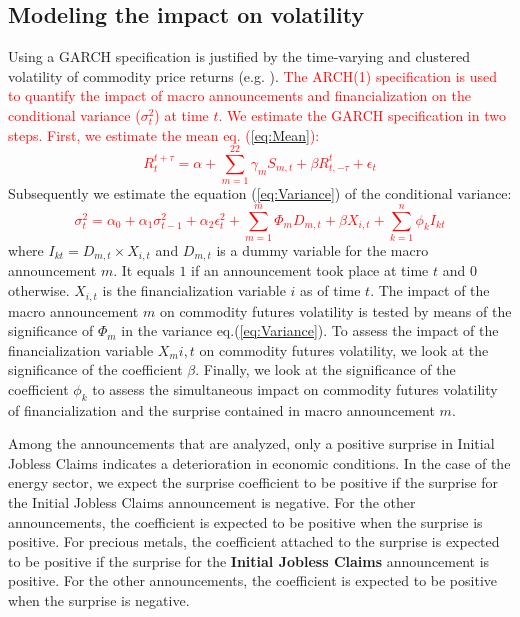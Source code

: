 \documentclass[12pt]{article}
\begin{document}
\subsection{Modeling the impact on volatility}\label{variance}
Using a GARCH specification is justified by the time-varying and clustered volatility of commodity price returns (e.g. \citep{hammoudeh2008metal}).
\textcolor{red}{
The ARCH(1) specification is used to quantify the impact of macro announcements and financialization on the conditional variance  ($\sigma_t^2$) at time $t$. We estimate the GARCH specification in two steps. First, we estimate the mean eq. (\ref{eq:Mean}):
\begin{equation}\label{eq:Mean}R_{t}^{t+\tau}=\alpha+\sum_{m=1}^{22} \gamma_m S_{m,t}+\beta R_{t,-\tau}^{t}+\epsilon_{t}
\end{equation}
}
Subsequently we estimate the equation (\ref{eq:Variance}) of the conditional variance:
\textcolor{red}{
\begin{equation}\label{eq:Variance}
\sigma_{t}^2=\alpha_0+\alpha_1 \sigma_{t-1}^2+\alpha_2 \epsilon_t^2 + \sum_{m=1}^m \Phi_m D_{m,t}+\beta X_{i,t}+\sum_{k=1}^n \phi_k I_{kt}
\end{equation}
}
where $I_{kt}=D_{m,t} \times X_{i,t}$ and $D_{m,t}$ is a dummy variable for the macro announcement $m$. It equals $1$ if an announcement took place at time $t$ and 0 otherwise. $X_{i,t}$  is the financialization variable $i$ as of time $t$. The impact of the macro announcement $m$ on commodity futures volatility is tested by means of the significance of $\Phi_m$ in the variance eq.(\ref{eq:Variance}). To assess the impact of the financialization variable $X_m{i,t}$ on commodity futures volatility, we look at the significance of the coefficient $\beta$. Finally, we look at the significance of the coefficient $\phi_k$ to assess the simultaneous impact on commodity futures volatility of  financialization  and the surprise contained in macro announcement $m$. 

Among the announcements that are analyzed, only a positive surprise in Initial Jobless Claims indicates a deterioration in economic conditions. In the case of the energy sector, we expect the surprise coefficient to be positive if the surprise for the Initial Jobless Claims announcement is negative. For the other announcements, the coefficient is expected to be positive when the surprise is positive. For precious metals, the coefficient attached to the surprise is expected to be positive if the surprise for the \textbf{Initial Jobless Claims} announcement is positive. For the other announcements, the coefficient is expected to be positive when the surprise is negative.
\end{document}
